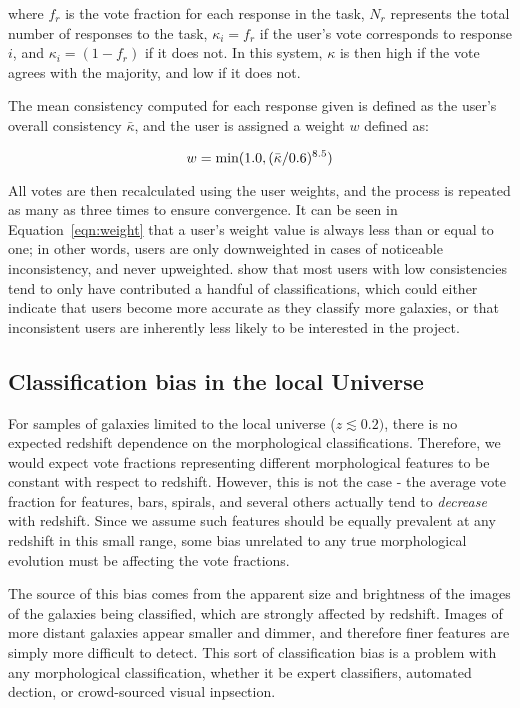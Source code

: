 where $f_{r}$ is the vote fraction for each response in the task, $N_{r}$ represents the total number of responses to the task, $\kappa_{i} = f_{r}$ if the user's vote corresponds to response $i$, and $\kappa_{i} = (1-f_{r})$ if it does not. In this system, $\kappa$ is then high if the vote agrees with the majority, and low if it does not. 

The mean consistency computed for each response given is defined as the user's overall consistency $\bar{\kappa}$, and the user is assigned a weight $w$ defined as:

\begin{equation}
w = \rm min (1.0,(\bar{\kappa}/0.6)^{8.5})
\label{eqn:weight}
\end{equation}

All votes are then recalculated using the user weights, and the process is repeated as many as three times to ensure convergence. It can be seen in Equation~\ref{eqn:weight} that a user's weight value is always less than or equal to one; in other words, users are only downweighted in cases of noticeable inconsistency, and never upweighted. \citet{Willett2013} show that most users with low consistencies tend to only have contributed a handful of classifications, which could either indicate that users become more accurate as they classify more galaxies, or that inconsistent users are inherently less likely to be interested in the project. 

 
\subsection{Classification bias in the local Universe}

For samples of galaxies limited to the local universe ($z\lesssim0.2)$, there is no expected redshift dependence on the morphological classifications. Therefore, we would expect vote fractions representing different morphological features to be constant with respect to redshift. However, this is not the case - the average vote fraction for features, bars, spirals, and several others actually tend to \emph{decrease} with redshift. Since we assume such features should be equally prevalent at any redshift in this small range, some bias unrelated to any true morphological evolution must be affecting the vote fractions. 

The source of this bias comes from the apparent size and brightness of the images of the galaxies being classified, which are strongly affected by redshift. Images of more distant galaxies appear smaller and dimmer, and therefore finer features are simply more difficult to detect. This sort of classification bias is a problem with any morphological classification, whether it be expert classifiers, automated dection, or crowd-sourced visual inpsection.

